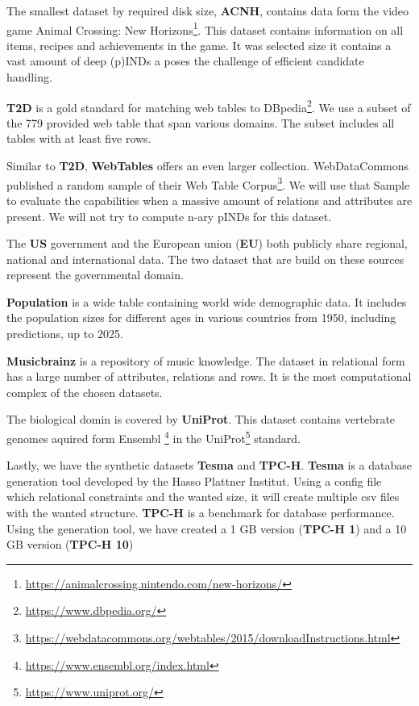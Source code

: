 The smallest dataset by required disk size, \textbf{ACNH}, contains data form the video game Animal Crossing: New Horizons\footnote{\url{https://animalcrossing.nintendo.com/new-horizons/}}. This dataset contains information on all items, recipes and achievements in the game. It was selected size it contains a vast amount of deep (p)INDs a poses the challenge of efficient candidate handling.

\textbf{T2D} is a gold standard for matching web tables to DBpedia\footnote{\url{https://www.dbpedia.org/}}. We use a subset of the 779 provided web table that span various domains. The subset includes all tables with at least five rows.

Similar to \textbf{T2D}, \textbf{WebTables} offers an even larger collection. WebDataCommons published a random sample of their Web Table Corpus\footnote{\url{https://webdatacommons.org/webtables/2015/downloadInstructions.html}}. We will use that Sample to evaluate the capabilities when a massive amount of relations and attributes are present. We will not try to compute n-ary pINDs for this dataset.

The \textbf{US} government and the European union (\textbf{EU}) both publicly share regional, national and international data. The two dataset that are build on these sources represent the governmental domain.

\textbf{Population} is a wide table containing world wide demographic data. It includes the population sizes for different ages in various countries from 1950, including predictions, up to 2025.

\textbf{Musicbrainz} is a repository of music knowledge. The dataset in relational form has a large number of attributes, relations and rows. It is the most computational complex of the chosen datasets.

The biological domin is covered by \textbf{UniProt}. This dataset contains vertebrate genomes aquired form Ensembl \footnote{\url{https://www.ensembl.org/index.html}} in the UniProt\footnote{\url{https://www.uniprot.org/}} standard.

Lastly, we have the synthetic datasets \textbf{Tesma} and \textbf{TPC-H}. \textbf{Tesma} is a database generation tool developed by the Hasso Plattner Institut. Using a config file which relational constraints and the wanted size, it will create multiple csv files with the wanted structure. \textbf{TPC-H} is a benchmark for database performance. Using the generation tool, we have created a 1 GB version (\textbf{TPC-H 1}) and a 10 GB version (\textbf{TPC-H 10})

